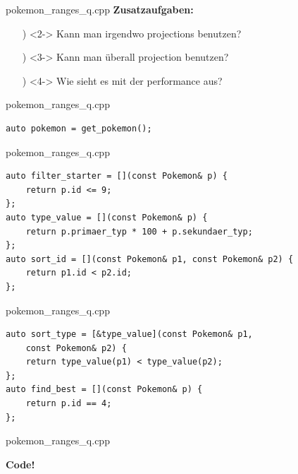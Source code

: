 \begin{frame}{pokemon\_ranges\_q.cpp}
    \textbf{Zusatzaufgaben:}\\
    \begin{enumerate} %
        \item[\✨)]<2-> Kann man irgendwo projections benutzen?
        \item[\✨)]<3-> Kann man überall projection benutzen?
        \item[\✨)]<4-> Wie sieht es mit der performance aus?
    \end{enumerate}
\end{frame}

\begin{frame}[fragile]{pokemon\_ranges\_q.cpp}
    \begin{verbatim}
auto pokemon = get_pokemon();
    \end{verbatim}
\end{frame}

\begin{frame}[fragile]{pokemon\_ranges\_q.cpp}
    \begin{verbatim}
auto filter_starter = [](const Pokemon& p) {
    return p.id <= 9;
};
auto type_value = [](const Pokemon& p) {
    return p.primaer_typ * 100 + p.sekundaer_typ;
};
auto sort_id = [](const Pokemon& p1, const Pokemon& p2) {
    return p1.id < p2.id;
};
    \end{verbatim}
\end{frame}

\begin{frame}[fragile]{pokemon\_ranges\_q.cpp}
    \begin{verbatim}
auto sort_type = [&type_value](const Pokemon& p1,
    const Pokemon& p2) {
    return type_value(p1) < type_value(p2);
};
auto find_best = [](const Pokemon& p) {
    return p.id == 4;
};
    \end{verbatim}
\end{frame}

\begin{frame}{pokemon\_ranges\_q.cpp}
    \begin{center}
        \textbf{Code!}
    \end{center}
\end{frame}


